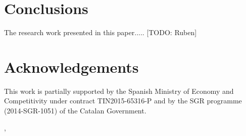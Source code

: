 \documentclass[journal]{IEEEtran}
\begin{document}
\section{Conclusions}
The research work presented in this paper..... 
[TODO: Ruben]

\section*{Acknowledgements}
This work is partially supported by the Spanish Ministry of Economy and Competitivity under contract TIN2015-65316-P and by the SGR programme (2014-SGR-1051) of the Catalan Government.

\begin{small}
,

\end{small}


\end{document}
